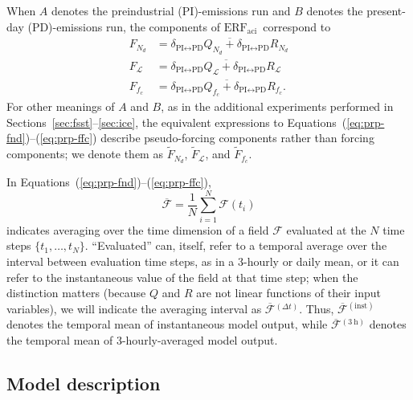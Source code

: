 \documentclass[acp, manuscript]{copernicus}\usepackage[]{graphicx}\usepackage[]{color}
\newcommand\nd{\ensuremath{N_d}}
\newcommand\lwp{\ensuremath{\mathcal L}}
\newcommand\fc{\ensuremath{f_c}}
\newcommand\cf{\fc}
\newcommand\erfaci{\ensuremath{\text{ERF}_\text{aci}}}
\begin{document}
When $A$ denotes the preindustrial (PI)-emissions run and $B$ denotes the
present-day (PD)-emissions run, the
components of \erfaci\ correspond to
\begin{align}
  \label{eq:prp-fnd}
  F_{\nd}  &= \overline{\delta_{\text{PI}\leftrightarrow\text{PD}} Q_{\nd}  + \delta_{\text{PI}\leftrightarrow \text{PD}} R_{\nd}} \\
  \label{eq:prp-flwp}
  F_{\lwp} &= \overline{\delta_{\text{PI}\leftrightarrow \text{PD}} Q_{\lwp} + \delta_{\text{PI}\leftrightarrow \text{PD}} R_{\lwp}} \\
  \label{eq:prp-ffc}
  F_{\cf}  &= \overline{\delta_{\text{PI}\leftrightarrow \text{PD}} Q_{\cf}  + \delta_{\text{PI}\leftrightarrow \text{PD}} R_{\cf}}.
\end{align}
For other meanings of $A$ and $B$, as in the additional experiments performed in
Sections~\ref{sec:fsst}--\ref{sec:ice}, the equivalent expressions to
Equations~(\ref{eq:prp-fnd})--(\ref{eq:prp-ffc}) describe pseudo-forcing
components rather than forcing components; we denote them as $\tilde{F}_{\nd}$,
$\tilde{F}_{\lwp}$, and $\tilde{F}_{\cf}$.

In Equations~(\ref{eq:prp-fnd})--(\ref{eq:prp-ffc}),
\begin{equation}
  \label{eq:tempav}
  \overline{\mathcal{F}} = \frac 1 N \sum\limits_{i = 1}^N  \mathcal{F}(t_i)
\end{equation}
indicates averaging over the time dimension of a field $\mathcal{F}$ evaluated
at the $N$ time steps $\{t_1,\dots,t_N\}$.  ``Evaluated'' can, itself, refer to
a temporal average over the interval between evaluation time steps, as in a
3-hourly or daily mean, or it can refer to the instantaneous value of the field
at that time step; when the distinction matters (because $Q$ and $R$ are not
linear functions of their input variables), we will indicate the averaging
interval as $\overline{\mathcal{F}}{}^{(\Delta t)}$.  Thus,
$\overline{\mathcal{F}}{}^{(\text{inst})}$ denotes the temporal mean of
instantaneous model output, while $\overline{\mathcal{F}}{}^{(3~\text{h})}$
denotes the temporal mean of 3-hourly-averaged model output.


\subsection{Model description}
\end{document}
